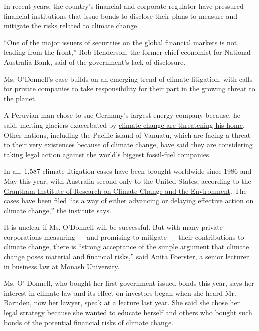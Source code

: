 In recent years, the country's financial and corporate regulator have
pressured financial institutions that issue bonds to disclose their
plans to measure and mitigate the risks related to climate change.

``One of the major issuers of securities on the global financial markets
is not leading from the front,'' Rob Henderson, the former chief
economist for National Australia Bank, said of the government's lack of
disclosure.

Ms. O'Donnell's case builds on an emerging trend of climate litigation,
with calls for private companies to take responsibility for their part
in the growing threat to the planet.

A Peruvian man chose to sue Germany's largest energy company because, he
said, melting glaciers exacerbated by
\href{https://www.nytimes3xbfgragh.onion/interactive/2019/04/09/magazine/climate-change-peru-law.html}{climate
change are threatening his home}. Other nations, including the Pacific
island of Vanuatu, which are facing a threat to their very existences
because of climate change, have said they are considering
\href{https://edition.cnn.com/2018/12/17/world/vanuatu-cop-climate-change-intl/index.html}{taking
legal action against the world's biggest fossil-fuel companies}.

In all, 1,587 climate litigation cases have been brought worldwide since
1986 and May this year, with Australia second only to the United States,
according to the
\href{http://www.lse.ac.uk/granthaminstitute/publication/global-trends-in-climate-change-litigation-2020-snapshot/}{Grantham
Institute of Research on Climate Change and the Environment}. The cases
have been filed ``as a way of either advancing or delaying effective
action on climate change,'' the institute says.

It is unclear if Ms. O'Donnell will be successful. But with many private
corporations measuring --- and promising to mitigate --- their
contributions to climate change, there is ``strong acceptance of the
simple argument that climate change poses material and financial
risks,'' said Anita Foerster, a senior lecturer in business law at
Monash University.

Ms. O' Donnell, who bought her first government-issued bonds this year,
says her interest in climate law and its effect on investors began when
she heard Mr. Barnden, now her lawyer, speak at a lecture last year. She
said she chose her legal strategy because she wanted to educate herself
and others who bought such bonds of the potential financial risks of
climate change.

